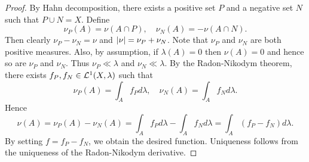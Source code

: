 \begin{proof}
    By Hahn decomposition, there exists a positive set $P$ and 
    a negative set $N$ such that $P\cup N = X$. Define 
    \begin{equation*}
        \nu_P(A) = \nu(A\cap P), \quad \nu_N(A) = -\nu(A\cap N).
    \end{equation*}
    Then clearly $\nu_P - \nu_N = \nu$ and $\left\lvert {\nu} \right\rvert = \nu_P + \nu_N$. 
    Note that $\nu_P$ and $\nu_N$ are both positive measures. 
    Also, by assumption, if $\lambda(A) = 0$ then $\nu(A) = 0$ 
    and hence so are $\nu_P$ and $\nu_N$. Thus $\nu_P\ll\lambda$ 
    and $\nu_N\ll\lambda$. By the Radon-Nikodym theorem, there 
    exists $f_P,f_N\in\mathcal{L}^1(X,\lambda)$ such that 
    \begin{equation*}
        \nu_P(A) = \int_A f_Pd\lambda, \quad \nu_N(A) = \int_A f_Nd\lambda.
    \end{equation*}
    Hence 
    \begin{equation*}
        \nu(A) = \nu_P(A) - \nu_N(A) = \int_A f_Pd\lambda - \int_A f_Nd\lambda 
        = \int_A (f_P-f_N)d\lambda.
    \end{equation*}
    By setting $f = f_P-f_N$, we obtain the desired function. 
    Uniqueness follows from the uniqueness of the Radon-Nikodym 
    derivative.
\end{proof}